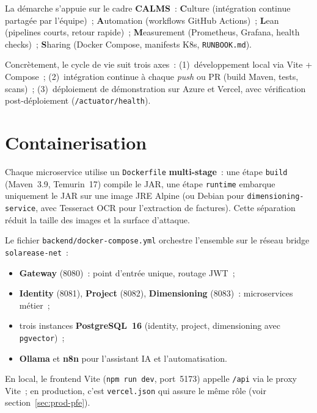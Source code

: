 La démarche s'appuie sur le cadre \textbf{CALMS}~:
\textbf{C}ulture (intégration continue partagée par l'équipe)~;
\textbf{A}utomation (workflows GitHub Actions)~;
\textbf{L}ean (pipelines courts, retour rapide)~;
\textbf{M}easurement (Prometheus, Grafana, health checks)~;
\textbf{S}haring (Docker Compose, manifests K8s, \texttt{RUNBOOK.md}).

Concrètement, le cycle de vie suit trois axes~: (1)~développement local
via Vite + Compose~; (2)~intégration continue à chaque \textit{push} ou PR
(build Maven, tests, scans)~; (3)~déploiement de démonstration sur Azure
et Vercel, avec vérification post-déploiement (\texttt{/actuator/health}).


\section{Containerisation}

Chaque microservice utilise un \texttt{Dockerfile} \textbf{multi-stage}~:
une étape \texttt{build} (Maven~3.9, Temurin~17) compile le JAR, une étape
\texttt{runtime} embarque uniquement le JAR sur une image JRE Alpine (ou
Debian pour \texttt{dimensioning-service}, avec Tesseract OCR pour l'extraction
de factures). Cette séparation réduit la taille des images et la surface
d'attaque.

Le fichier \texttt{backend/docker-compose.yml} orchestre l'ensemble sur le
réseau bridge \texttt{solarease-net}~:
\begin{itemize}[leftmargin=*, nosep]
  \item \textbf{Gateway} (8080)~: point d'entrée unique, routage JWT~;
  \item \textbf{Identity} (8081), \textbf{Project} (8082),
        \textbf{Dimensioning} (8083)~: microservices métier~;
  \item trois instances \textbf{PostgreSQL~16} (identity, project,
        dimensioning avec \texttt{pgvector})~;
  \item \textbf{Ollama} et \textbf{n8n} pour l'assistant IA et l'automatisation.
\end{itemize}

En local, le frontend Vite (\texttt{npm run dev}, port~5173) appelle
\texttt{/api} via le proxy Vite~; en production, c'est \texttt{vercel.json}
qui assure le même rôle (voir section~\ref{sec:prod-pfe}).

